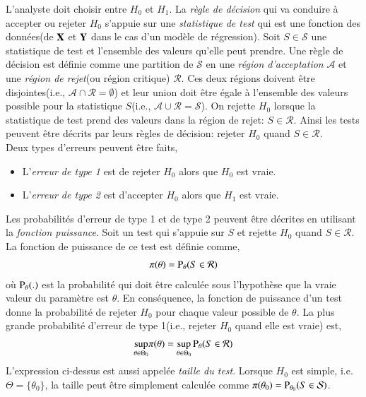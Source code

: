 \documentclass[10pt, reqno]{amsart}
\begin{document}
L'analyste doit choisir entre $H_0$ et $H_1$.  La \emph{règle de décision} qui va conduire à accepter ou rejeter $H_0$ s'appuie sur une \emph{statistique de test} qui est une fonction des données(de $\mathbf X$ et $\mathbf Y$ dans le cas d'un modèle de régression). Soit $S\in \mathcal{S}$ une statistique de test et l'ensemble des valeurs qu'elle peut prendre. Une règle de décision est définie comme une partition de $\mathcal{S}$ en une \emph{région d'acceptation} $\mathcal{A}$ et une \emph{région de rejet}(ou région critique) $\mathcal{R}$. Ces deux régions doivent être disjointes(i.e., $\mathcal{A}\cap\mathcal{R} = \emptyset$) et leur union doit être égale à l'ensemble des valeurs possible pour la statistique $S$(i.e.,  $\mathcal{A}\cup\mathcal{R} = \mathcal{S}$). On rejette $H_0$ lorsque la statistique de test prend des valeurs dans la région de rejet: $S\in\mathcal{R}$. Ainsi les tests peuvent être décrits par leurs règles de décision: rejeter $H_0$ quand $S\in\mathcal{R}$.\\
Deux types d'erreurs peuvent être faits,
\begin{itemize}[label = - ]
\item L'\emph{erreur de type 1} est de rejeter $H_0$ alors que $H_0$ est vraie.
\item L'\emph{erreur de type 2} est d'accepter $H_0$ alors que $H_1$ est vraie.
\end{itemize}
Les probabilités d'erreur de type 1 et de type 2 peuvent être décrites en utilisant la \emph{fonction puissance}. Soit un test qui s'appuie sur $S$ et rejette $H_0$ quand $S\in\mathcal{R}$. La fonction de puissance de ce test est définie comme,
\begin{align*}
\pi(\theta) = \operatorname{P}_\theta(S\in \mathcal{R})
\end{align*}
où $\operatorname{P}_\theta(.)$ est la probabilité qui doit être calculée sous l'hypothèse que la vraie valeur du paramètre est $\theta$. En conséquence, la fonction de puissance d'un test donne la probabilité de rejeter $H_0$ pour chaque valeur possible de $\theta$. La plus grande probabilité d'erreur de type 1(i.e., rejeter $H_0$ quand elle est vraie) est,
\begin{align}
\underset{\theta \in \Theta_0}{\sup} \pi(\theta)=\underset{\theta \in \Theta_0}{\sup}\operatorname{P}_\theta(S\in \mathcal{R})
\label{eq47}
\end{align}
L'expression ci-dessus est aussi appelée \emph{taille du test}. Lorsque $H_0$ est simple, i.e. $\Theta = \{\theta_0\}$, la taille peut être simplement calculée comme $\pi(\theta_0) = \operatorname{P}_{\theta_0}(S\in\mathcal{S})$.\\
\end{document}
